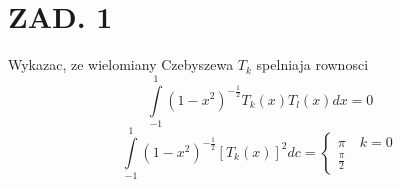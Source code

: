 \documentclass{article}[16pt]
\begin{document}
\section*{ZAD. 1}

Wykazac, ze wielomiany Czebyszewa $T_k$ spelniaja rownosci
$$\int\limits_{-1}^1(1-x^2)^{-\frac12}T_k(x)T_l(x)dx=0$$
$$\int\limits_{-1}^1(1-x^2)^{-\frac12}[T_k(x)]^2dc=\begin{cases}
    \pi\quad k=0\\
    \frac\pi2
\end{cases}$$
\end{document}
